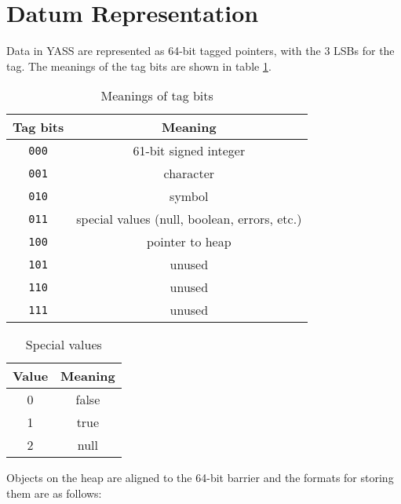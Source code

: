 \documentclass{article}
\begin{document}
\section{Datum Representation}

Data in YASS are represented as 64-bit
tagged pointers, with the 3 LSBs for the tag. The meanings of the tag bits
are shown in table \ref{tab:tags}.

\begin{table}
  \centering
  \begin{tabular}{cc}
    \toprule
    Tag bits & Meaning \\
    \midrule
    \verb|000| & 61-bit signed integer \\
    \verb|001| & character \\
    \verb|010| & symbol \\
    \verb|011| & special values (null, boolean, errors, etc.) \\
    \verb|100| & pointer to heap \\
    \verb|101| & unused \\
    \verb|110| & unused \\
    \verb|111| & unused \\
    \bottomrule
  \end{tabular}
  \caption{Meanings of tag bits}
  \label{tab:tags}
\end{table}

\begin{table}
  \centering
  \begin{tabular}{cc}
    \toprule
    Value & Meaning \\
    \midrule
    0 & false \\
    1 & true \\
    2 & null \\
    \bottomrule
  \end{tabular}
  \caption{Special values}
  \label{tab:special}
\end{table}

Objects on the heap are aligned to the 64-bit barrier and the formats
for storing them are as follows:
\end{document}
